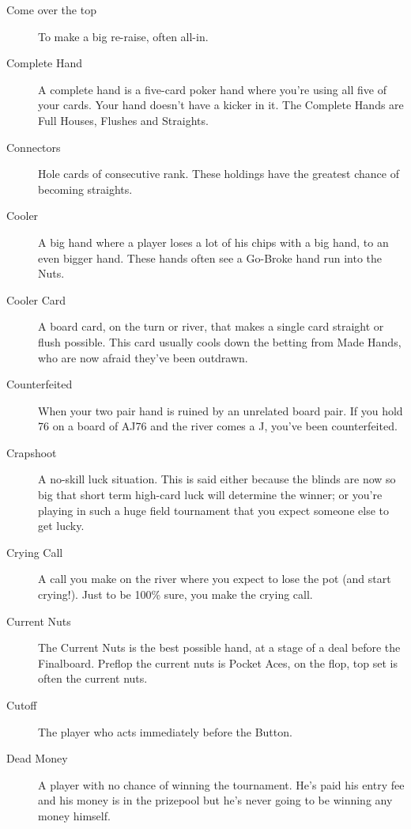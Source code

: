 \begin{description}
\item[Come over the top] To make a big re-raise, often all-in.

\item[Complete Hand] A complete hand is a five-card poker hand where
you're using all five of your cards. Your hand doesn't have a kicker
in it. The Complete Hands are Full Houses, Flushes and Straights.

\item[Connectors] Hole cards of consecutive rank. These holdings have
the greatest chance of becoming straights.

\item[Cooler] A big hand where a player loses a lot of his chips with
a big hand, to an even bigger hand. These hands often see a Go-Broke
hand run into the Nuts.

\item[Cooler Card] A board card, on the turn or river, that makes a
single card straight or flush possible. This card usually cools down
the betting from Made Hands, who are now afraid they've been outdrawn.

\item[Counterfeited] When your two pair hand is ruined by an unrelated
board pair. If you hold 76 on a board of AJ76 and the river comes a J,
you've been counterfeited.

\item[Crapshoot] A no-skill luck situation. This is said either
because the blinds are now so big that short term high-card luck will
determine the winner; or you're playing in such a huge field
tournament that you expect someone else to get lucky.

\item[Crying Call] A call you make on the river where you expect to
lose the pot (and start crying!). Just to be 100\% sure, you make the
crying call.

\item[Current Nuts] The Current Nuts is the best possible hand, at a
stage of a deal before the Finalboard. Preflop the current nuts is
Pocket Aces, on the flop, top set is often the current nuts.

\item[Cutoff] The player who acts immediately before the Button.

\item[Dead Money] A player with no chance of winning the tournament.
He's paid his entry fee and his money is in the prizepool but he's
never going to be winning any money himself.


\end{description}
